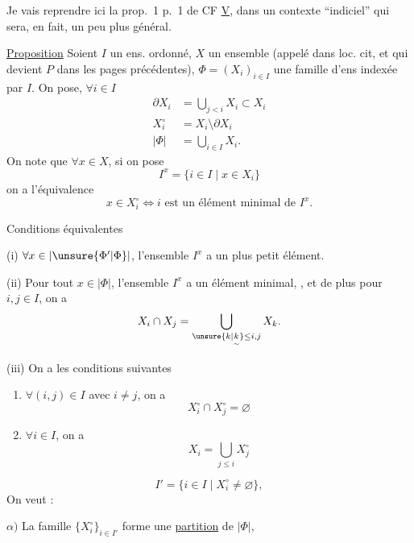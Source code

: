 
Je vais reprendre ici la prop.~1 p.~1 de CF \uline{V}, dans un contexte ``indiciel'' qui sera, en fait, un peu plus général.

\uline{Proposition} Soient $I$ un ens. ordonné,  $X$ un ensemble (appelé  dans loc. cit, et qui devient $P$ dans les pages précédentes), $\Phi=(X_i)_{i\in I}$ une famille d'ens indexée par $I$. 
\margin{[Je ne suis pas sûr si je l'utilise vraiment, si on ne le \unsure{suppose} pas, pour définir $X_i^{\circ}$ \unsure{(?)} il faut prendre $X_i\setminus X_i\cap\partial X_i$ (car on ne sait pas si $\partial X_i\subset X_i$)}
On pose, $\forall i\in I$
\[
\begin{aligned}
\partial X_i&=\bigcup_{j<i}X_i\subset X_i\\
X_i^{\circ}&=X_i\setminus\partial X_i\\
|\Phi|&=\bigcup_{i\in I}X_i.
\end{aligned}
\]
On note que $\forall x\in X$,  si on pose
\[
I^x=\{i\in I\mid x\in X_i\}
\]
on a l'équivalence
\[
x\in X_i^{\circ}\Longleftrightarrow i\text{ est un élément minimal de }I^x.
\]

Conditions équivalentes

(i) $\forall x\in|\unsure{\Phi'|\Phi}|$, l'ensemble $I^x$ a un plus petit élément.

(ii) Pour tout $x\in|\Phi|$, l'ensemble $I^x$ a un élément minimal, , et de plus pour $i,j\in I$, on a
\[
X_i\cap X_j=\bigcup_{\unsure{k|\underset{\sim}{k}}\leq i,j}X_k.
\]

(iii) On a les conditions suivantes

\begin{enumerate}[label=\alph*)]
\item $\forall(i,j)\in I$ avec $i\ne j$, on a
\[
X_i^{\circ}\cap X_j^{\circ}=\varnothing
\]
\item {} $\forall i\in I$, on a
\[
X_i=\bigcup_{j\leq i}X_j^{\circ}
\]
\end{enumerate}

\[
I'=\{i\in I\mid X_i^{\circ}\ne\varnothing\},
\]
 On veut :

$\alpha)$ La famille $\{X_i^{\circ}\}_{i\in I'}$ forme une \uline{partition} de $|\Phi|$, 
